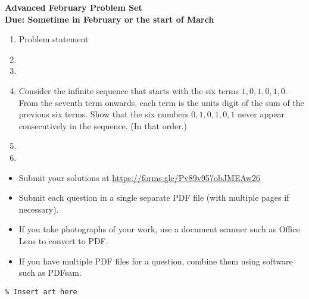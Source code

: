\documentclass{article}
\begin{document}
\thispagestyle{empty}

\begin{center}
  \textbf{\Large Advanced February Problem Set}
  \\ \vspace{1em}
  \textbf{\large Due: Sometime in February or the start of March}
\end{center}

\bigskip

\begin{enumerate}[itemsep=\fill]

\item %
Problem statement


\item %


\item %


\item %
Consider the infinite sequence that starts with the six terms $1, 0, 1, 0, 1, 0$. From the seventh term onwards, each term is the units digit of the sum of the previous six terms. Show that the six numbers $0, 1, 0, 1, 0, 1$ never appear consecutively in the sequence. (In that order.)


\item %


\item %

\end{enumerate}


\vfill
\small
\begin{itemize}
	\item Submit your solutions at \href{https://forms.gle/Pv89v957obJMEAw26}{https://forms.gle/Pv89v957obJMEAw26}
	\item Submit each question in a single separate PDF file (with multiple pages if necessary).
	\item If you take photographs of your work, use a document scanner such as Office Lens to convert to PDF.
	\item If you have multiple PDF files for a question, combine them using software such as PDFsam.
\end{itemize}

\vfill
\centering
\small
\begin{BVerbatim}
\end{BVerbatim}
\end{document}
